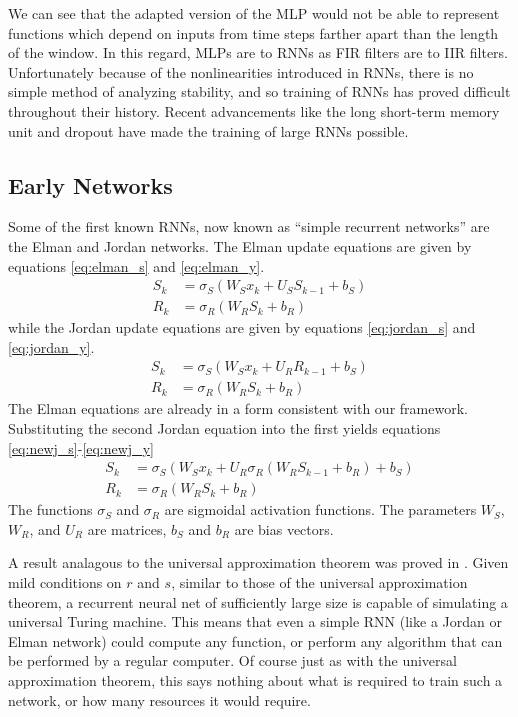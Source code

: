 We can see that the adapted version of the MLP would not be able to represent functions which depend on inputs from time steps farther apart than the length of the window.  In this regard, MLPs are to RNNs as FIR filters are to IIR filters.  Unfortunately because of the nonlinearities introduced in RNNs, there is no simple method of analyzing stability, and so training of RNNs has proved difficult throughout their history.  Recent advancements like the long short-term memory unit and dropout have made the training of large RNNs possible.

\subsection{Early Networks}
Some of the first known RNNs, now known as ``simple recurrent networks'' are the Elman \cite{je90} and Jordan \cite{mj86} networks.  The Elman update equations are given by equations \ref{eq:elman_s} and \ref{eq:elman_y}.
\begin{align}
S_k &= \sigma_S(W_Sx_k+U_SS_{k-1}+b_S\label{eq:elman_s})\\
R_k &= \sigma_R(W_RS_k+b_R)\label{eq:elman_y}
\end{align}
while the Jordan update equations are given by equations \ref{eq:jordan_s} and \ref{eq:jordan_y}.
\begin{align}
S_k &= \sigma_S(W_Sx_k+U_R R_{k-1}+b_S) \label{eq:newj_s} \\
R_k &= \sigma_R(W_R S_k + b_R) \label{eq:newj_y}
\end{align}
The Elman equations are already in a form consistent with our framework.  Substituting the second Jordan equation into the first yields equations \ref{eq:newj_s}-\ref{eq:newj_y}
\begin{align}
S_k &= \sigma_S(W_Sx_k+U_R \sigma_R(W_R S_{k-1} + b_R)+b_S)\label{eq:jordan_s}\\
R_k &= \sigma_R(W_R S_k + b_R) \label{eq:jordan_y}
\end{align}
The functions $\sigma_S$ and $\sigma_R$ are sigmoidal activation functions.  The parameters $W_S$,$W_R$, and $U_R$ are matrices, $b_S$ and $b_R$ are bias vectors.

A result analagous to the universal approximation theorem was proved in \cite{hs91}.  Given mild conditions on $r$ and $s$, similar to those of the universal approximation theorem, a recurrent neural net of sufficiently large size is capable of simulating a universal Turing machine.  This means that even a simple RNN (like a Jordan or Elman network) could compute any function, or perform any algorithm that can be performed by a regular computer.  Of course just as with the universal approximation theorem, this says nothing about what is required to train such a network, or how many resources it would require.

